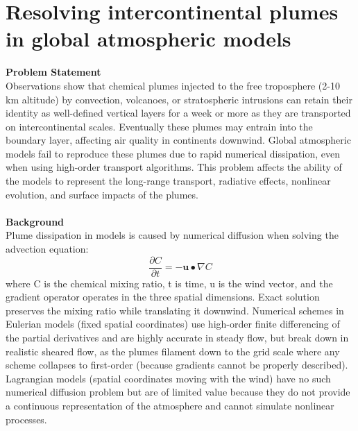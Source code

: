 \documentclass[fleqn, 11pt]{wlscirep}
\begin{document}
\section*{\centering Resolving intercontinental plumes in global atmospheric models}
\textbf{Problem Statement}\\
Observations show that chemical plumes injected to the free troposphere (2-10 km altitude) by convection, volcanoes, or stratospheric intrusions can retain their identity as well-defined vertical layers for a week or more as they are transported on intercontinental scales.\cite{newell} \cite{thouret} \cite{heald} Eventually these plumes may entrain into the boundary layer, affecting air quality in continents downwind. Global atmospheric models fail to reproduce these plumes due to rapid numerical dissipation, even when using high-order transport algorithms.\cite{rastig} This problem affects the ability of the models to represent the long-range transport, radiative effects, nonlinear evolution, and surface impacts of the plumes.\cite{wild} \cite{zhuang}\ \cite{eastham}\ \\ \\
\textbf{Background}\\
Plume dissipation in models is caused by numerical diffusion when solving the advection equation:
\begin{equation}
\frac{\partial C}{\partial t}=-\textbf{u}\bullet \nabla C
\end{equation}
where C is the chemical mixing ratio, t is time, u is the wind vector, and the gradient operator operates in the three spatial dimensions. Exact solution preserves the mixing ratio while translating it downwind.\cite{rastig} Numerical schemes in Eulerian models (fixed spatial coordinates) use high-order finite differencing of the partial derivatives and are highly accurate in steady flow, but break down in realistic sheared flow, as the plumes filament down to the grid scale where any scheme collapses to first-order (because gradients cannot be properly described). Lagrangian models (spatial coordinates moving with the wind) have no such numerical diffusion problem but are of limited value because they do not provide a continuous representation of the atmosphere and cannot simulate nonlinear processes.\cite{brasseurjacob} 
\end{document}
